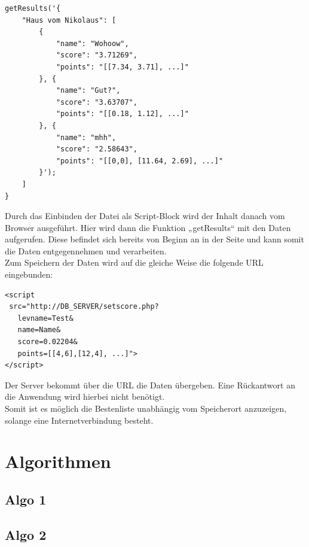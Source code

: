 \documentclass[a4paper,twocolumn]{scrartcl}
\begin{document}
\newblock
\begin{lstlisting}
getResults('{
    "Haus vom Nikolaus": [
        {
            "name": "Wohoow",
            "score": "3.71269",
            "points": "[[7.34, 3.71], ...]"
        }, {
            "name": "Gut?",
            "score": "3.63707",
            "points": "[[0.18, 1.12], ...]"
        }, {
            "name": "mhh",
            "score": "2.58643",
            "points": "[[0,0], [11.64, 2.69], ...]"
        }');
    ]
}
\end{lstlisting}
\newblock
Durch das Einbinden der Datei als Script-Block wird der Inhalt danach vom Browser ausgeführt. Hier wird dann die Funktion „getResults“ mit den Daten aufgerufen. Diese befindet sich bereits von Beginn an in der Seite und kann somit die Daten entgegennehmen und verarbeiten.\\
Zum Speichern der Daten wird auf die gleiche Weise die folgende URL eingebunden:\\

\begin{lstlisting}
<script
 src="http://DB_SERVER/setscore.php?
   levname=Test&
   name=Name&
   score=0.02204&
   points=[[4,6],[12,4], ...]">
</script>
\end{lstlisting}
Der Server bekommt über die URL die Daten übergeben. Eine Rückantwort an die Anwendung wird hierbei nicht benötigt.\\
Somit ist es möglich die Bestenliste unabhängig vom Speicherort anzuzeigen, solange eine Internetverbindung besteht.


\section{Algorithmen}

\subsection{Algo 1}
\subsection{Algo 2}
\end{document}
